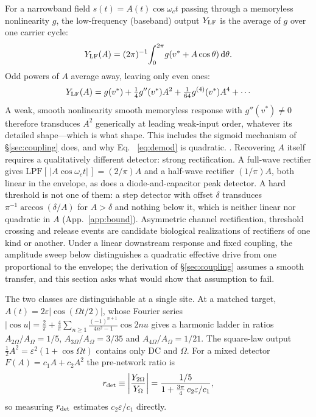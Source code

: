 \documentclass[11pt,a4paper]{article}
\newcommand{\half}{\tfrac{1}{2}}
\providecommand{\DIFaddtex}[1]{{\protect\color{blue} \sf #1}} %
\providecommand{\DIFdeltex}[1]{{\protect\color{red} \scriptsize #1}} %
\providecommand{\DIFaddbegin}{} %
\providecommand{\DIFaddend}{} %
\providecommand{\DIFdelbegin}{} %
\providecommand{\DIFdelend}{} %
\providecommand{\DIFadd}[1]{\texorpdfstring{\DIFaddtex{#1}}{#1}} %
\providecommand{\DIFdel}[1]{\texorpdfstring{\DIFdeltex{#1}}{}} %
\begin{document}
For a narrowband field $s(t)=A(t)\cos\omega_c t$ passing through a memoryless nonlinearity
$g$, the low-frequency (baseband) output $Y_{\rm LF}$ is the average of $g$ over one
carrier cycle:
\[
Y_{\rm LF}(A)=(2\pi)^{-1}\!\int_0^{2\pi}\!g(v^*+A\cos\theta)\,\mathrm{d}\theta.
\]
Odd powers of $A$ average away, leaving only even ones:
\begin{equation}
Y_{\rm LF}(A)=g(v^*)+\tfrac14 g''(v^*)A^2+\tfrac1{64}g^{(4)}(v^*)A^4+\cdots
\label{eq:cycavg}
\end{equation}
A \DIFdelbegin \DIFdel{weak, smooth nonlinearity }\DIFdelend \DIFaddbegin \DIFadd{smooth memoryless response with $g''(v^*)\neq0$ }\DIFaddend therefore transduces $A^2$ \DIFdelbegin \DIFdel{generically}\DIFdelend \DIFaddbegin \DIFadd{at
leading weak-input order}\DIFaddend , whatever its detailed \DIFdelbegin \DIFdel{shape---which is what }\DIFdelend \DIFaddbegin \DIFadd{shape. This includes }\DIFaddend the sigmoid
mechanism of \S\ref{sec:coupling}\DIFdelbegin \DIFdel{does, and why
Eq. ~\eqref{eq:demod} is quadratic. }\DIFdelend \DIFaddbegin \DIFadd{. }\DIFaddend Recovering $A$ itself requires a qualitatively
different detector: strong rectification. A full-wave rectifier gives
$\mathrm{LPF}[\,|A\cos\omega_c t|\,]=(2/\pi)A$ and a half-wave rectifier
$(1/\pi)A$, both linear in the envelope, as does a diode-and-capacitor peak detector.
A hard threshold is not one of them: a step detector with offset $\delta$ transduces
$\pi^{-1}\arccos(\delta/A)$ for $A>\delta$ and nothing below it, which is neither linear
nor quadratic in $A$ (App.~\ref{app:bound}). Asymmetric channel rectification, threshold
crossing and release events are candidate biological realizations of rectifiers of one
kind or another. Under a linear downstream response and fixed coupling, the amplitude
sweep below distinguishes a quadratic effective drive from one proportional to the
envelope; the derivation of \S\ref{sec:coupling} assumes a smooth transfer, and this
section asks what would show that assumption to fail.

The two classes are distinguishable at a single site. At a matched target,
$A(t)=2\varepsilon|\cos(\Omega t/2)|$, whose Fourier series
$|\cos u|=\tfrac2\pi+\tfrac4\pi\sum_{n\ge1}\tfrac{(-1)^{n+1}}{4n^2-1}\cos 2nu$ gives a
harmonic ladder in ratios $A_{2\Omega}/A_\Omega=1/5$, $A_{3\Omega}/A_\Omega=3/35$ and
$A_{4\Omega}/A_\Omega=1/21$. The square-law output $\half A^2=\varepsilon^2(1+\cos\Omega
t)$ contains only DC and $\Omega$. For a mixed detector $F(A)=c_1A+c_2A^2$ the
pre-network ratio is
\begin{equation}
r_{\rm det}\equiv\left|\frac{Y_{2\Omega}}{Y_\Omega}\right|
=\frac{1/5}{1+\tfrac{3\pi}{4}\,c_2\varepsilon/c_1},
\label{eq:rdet}
\end{equation}
so measuring $r_{\rm det}$ estimates $c_2\varepsilon/c_1$ directly.
\end{document}
